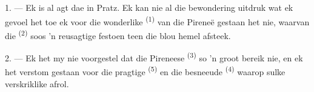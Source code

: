 %
%
%
%

\VUsaut{4.0mm}
\VUsaut{3.0mm}

\VUsaut{3.0mm}

\VUsaut{3.0mm}

1. --- Ek is al agt dae in Pratz. Ek kan nie al die bewondering uitdruk wat ek gevoel het
toe ek voor die wonderlike  \textsuperscript{(1)} van die Pireneë
gestaan het nie, waarvan die  \textsuperscript{(2)} soos 'n reusagtige festoen
teen die blou hemel afsteek.

2. --- Ek het my nie voorgestel dat die Pireneese  \textsuperscript{(3)} so
'n groot  bereik nie, en ek het verstom gestaan voor die pragtige
 \textsuperscript{(5)} en die besneeude 
\textsuperscript{(4)} waarop sulke verskriklike  afrol.

\VUsaut{3.0mm}
\VUsaut{3.0mm}

